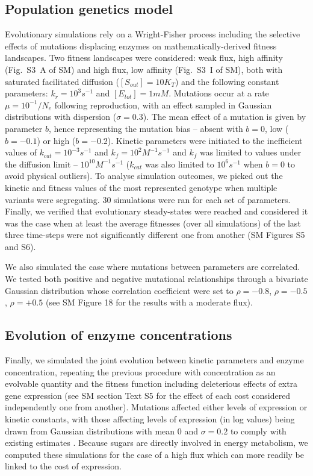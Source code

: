 \documentclass[nogrid,crop,final]{MBE2}%
\begin{document}
\subsection{Population genetics model}

Evolutionary simulations rely on a Wright-Fisher process including the selective effects of mutations displacing enzymes on mathematically-derived fitness landscapes. Two fitness landscapes were considered: weak flux, high affinity (Fig.~S3~A of SM) and high flux, low affinity (Fig.~S3~I of SM), both with saturated facilitated diffusion ($[S_{out}]=10K_T$) and the following constant parameters: $k_r=10^3s^{-1}$ and $[E_{tot}]=1mM$. Mutations occur at a rate $\mu=10^{-1}/N_e$ following reproduction, with an effect sampled in Gaussian distributions with dispersion ($\sigma=0.3$). The mean effect of a mutation is given by parameter $b$, hence representing the mutation bias -- absent with $b=0$, low ($b=-0.1$) or high ($b=-0.2$). Kinetic parameters were initiated to the inefficient values of $k_{cat}=10^{-3}s^{-1}$ and $k_f=10^2M^{-1}s^{-1}$ and $k_f$ was limited to values under the diffusion limit -- $10^{10}M^{-1}s^{-1}$ ($k_{cat}$ was also limited to $10^{6}s^{-1}$ when $b=0$ to avoid physical outliers). To analyse simulation outcomes, we picked out the kinetic and fitness values of the most represented genotype when multiple variants were segregating. 30 simulations were ran for each set of parameters. Finally, we verified that evolutionary steady-states were reached and considered it was the case when at least the average fitnesses (over all simulations) of the last three time-steps were not significantly different one from another (SM Figures S5 and S6).

We also simulated the case where mutations between parameters are correlated. We tested both positive and negative mutational relationships through a bivariate Gaussian distribution whose correlation coefficient were set to $\rho=-0.8$, $\rho=-0.5$, $\rho=+0.5$ (see SM Figure 18 for the results with a moderate flux). 

\subsection{Evolution of enzyme concentrations}

Finally, we simulated the joint evolution between kinetic parameters and enzyme concentration, repeating the previous procedure with concentration as an evolvable quantity and the fitness function including deleterious effects of extra gene expression (see SM section Text S5 for the effect of each cost considered independently one from another). Mutations affected either levels of expression or kinetic constants, with those affecting levels of expression (in log values) being drawn from Gaussian distributions with mean $0$ and $\sigma=0.2$ to comply with existing estimates \citep{Landry07,Metzger16,Hodgins-Davis19}. Because sugars are directly involved in energy metabolism, we computed these simulations for the case of a high flux which can more readily be linked to the cost of expression.
\end{document}
